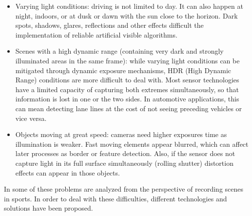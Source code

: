 \begin{itemize}
    \item Varying light conditions: driving is not limited to day. 
    It can also happen at night, indoors, or at dusk or dawn 
    with the sun close to the horizon. Dark spots, shadows, glares, 
    reflections and other effects difficult the implementation of reliable 
    artificial visible algorithms.
    
    \item Scenes with a high dynamic range (containing very dark and strongly
    illuminated areas in the same frame): while varying light conditions
    can be mitigated through dynamic exposure mechanisms, HDR (High Dynamic
    Range) conditions are more difficult to deal with. Most sensor technologies
    have a  limited capacity of capturing both extremes simultaneously, so that 
    information is lost in one or the two sides. In automotive applications, 
    this can mean detecting lane lines at the cost of not seeing preceding
    vehicles or vice versa.
        
    \item Objects moving at great speed: cameras need higher exposures time as
    illumination is weaker. Fast moving elements appear blurred, which can 
    affect later processes as border or feature detection. Also, if the sensor
    does not capture light in its full surface simultaneously (rolling shutter)
    distortion effects can appear in those objects.
\end{itemize}

In \cite{Pueo2016} some of these problems are analyzed from the perspective of
recording scenes in sports.
In order to deal with these difficulties, different technologies and solutions 
have been proposed. 

